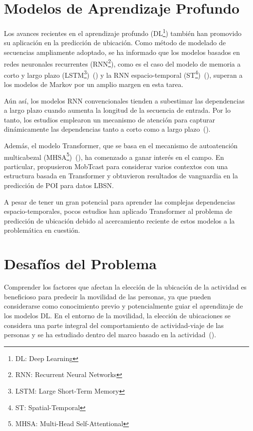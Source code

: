 \section{Modelos de Aprendizaje Profundo}
Los avances recientes en el aprendizaje profundo (DL\footnote{DL: Deep Learning}) también han 
promovido su aplicación en la predicción de ubicación. Como método 
de modelado de secuencias ampliamente adoptado, se ha informado que 
los modelos basados en redes neuronales recurrentes (RNN\footnote{RNN: Recurrent Neural Networks}), como es el caso del
modelo de memoria a corto y largo plazo (LSTM\footnote{LSTM: Large Short-Term Memory})~(\cite{solomon2021analyzing}) y la RNN 
espacio-temporal (ST\footnote{ST: Spatial-Temporal})~(\cite{liu2016predicting}), superan a los modelos de Markov
 por un amplio margen en esta tarea. 
 
 Aún así, los modelos RNN 
 convencionales tienden a subestimar las dependencias a largo 
 plazo cuando aumenta la longitud de la secuencia de entrada. 
 Por lo tanto, los estudios emplearon un mecanismo de atención 
 para capturar dinámicamente las dependencias tanto a corto 
 como a largo plazo~(\cite{feng2018deepmove,li2020hierarchical}). 
 
 Además, el modelo Transformer, 
 que se basa en el mecanismo de autoatención multicabezal (MHSA\footnote{MHSA: Multi-Head Self-Attentional})~(\cite{vaswani2017attention}), 
 ha comenzado a ganar interés en el campo. En particular, \cite{xue2021mobtcast}
 propusieron MobTcast para considerar 
  varios contextos con una estructura basada en Transformer 
  y obtuvieron resultados de vanguardia en la predicción de POI 
  para datos LBSN. 
  
  A pesar de tener un gran potencial para 
  aprender las complejas dependencias espacio-temporales, pocos 
  estudios han aplicado Transformer al problema de predicción 
  de ubicación debido al acercamiento reciente de estos modelos a la problem\'atica en cuesti\'on.

\section{Desaf\'ios del Problema}
Comprender los factores que afectan la elección de la ubicación de 
la actividad es beneficioso para predecir la movilidad de las personas, 
ya que pueden considerarse como conocimiento previo y potencialmente 
guiar el aprendizaje de los modelos DL. En el entorno de la movilidad, 
la elección de ubicaciones se considera una parte integral
del comportamiento de actividad-viaje de las personas y se ha
estudiado dentro del marco basado en la actividad~(\cite{schonfelder2016urban}). 

